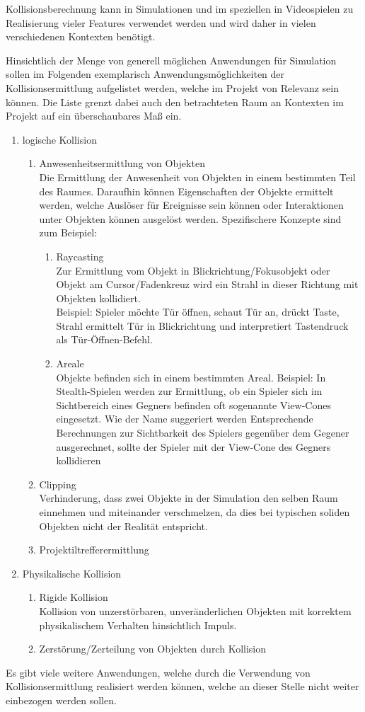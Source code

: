 \label{sec:usages}
Kollisionsberechnung kann in Simulationen und im speziellen in Videospielen zu Realisierung vieler Features verwendet werden und wird daher in vielen verschiedenen Kontexten benötigt. 

Hinsichtlich der Menge von generell möglichen Anwendungen für Simulation sollen im Folgenden exemplarisch Anwendungsmöglichkeiten der Kollisionsermittlung aufgelistet werden, welche im Projekt von Relevanz sein können. Die Liste grenzt dabei auch den betrachteten Raum an Kontexten im Projekt auf ein überschaubares Maß ein. 

\begin{enumerate}
	\item logische Kollision\\
	\begin{enumerate}
		\item Anwesenheitsermittlung von Objekten\\
	Die Ermittlung der Anwesenheit von Objekten in einem bestimmten Teil des Raumes. Daraufhin können Eigenschaften der Objekte ermittelt werden, welche Auslöser für Ereignisse sein können oder Interaktionen unter Objekten können ausgelöst werden. Spezifischere Konzepte sind zum Beispiel: 
		\begin{enumerate}
			\item Raycasting\\
	Zur Ermittlung vom Objekt in Blickrichtung/Fokusobjekt oder Objekt am Cursor/Fadenkreuz wird ein Strahl in dieser Richtung mit Objekten kollidiert.\\
	Beispiel: Spieler möchte Tür öffnen, schaut Tür an, drückt Taste, Strahl ermittelt Tür in Blickrichtung und interpretiert Tastendruck als Tür-Öffnen-Befehl.
			\item Areale\\
	Objekte befinden sich in einem bestimmten Areal.
	Beispiel: In Stealth-Spielen werden zur Ermittlung, ob ein  Spieler sich im Sichtbereich eines Gegners befinden oft sogenannte View-Cones eingesetzt. Wie der Name suggeriert werden Entsprechende Berechnungen zur Sichtbarkeit des Spielers gegenüber dem Gegener ausgerechnet, sollte der Spieler mit der View-Cone des Gegners kollidieren
		\end{enumerate}
		\item Clipping\\
	Verhinderung, dass zwei Objekte in der Simulation den selben Raum einnehmen und miteinander verschmelzen, da dies bei typischen soliden Objekten nicht der Realität entspricht.
		\item Projektiltrefferermittlung
	\end{enumerate}

	\item Physikalische Kollision
		\begin{enumerate}
			\item Rigide Kollision\\
		Kollision von unzerstörbaren, unveränderlichen Objekten mit korrektem physikalischem Verhalten hinsichtlich Impuls.
			\item Zerstörung/Zerteilung von Objekten durch Kollision
		\end{enumerate}
\end{enumerate}

Es gibt viele weitere Anwendungen, welche durch die Verwendung von Kollisionsermittlung realisiert werden können, welche an dieser Stelle nicht weiter einbezogen werden sollen.

